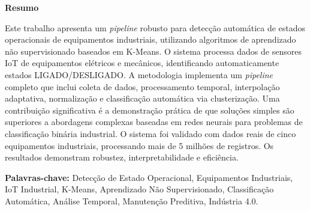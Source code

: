 
\begin{center}
    \huge{{\bf Resumo}}
    \vspace{2cm}

\end{center}

\begin{sloppypar}

    Este trabalho apresenta um \textit{pipeline} robusto para detecção automática de estados operacionais de equipamentos industriais, utilizando algoritmos de aprendizado não supervisionado baseados em K-Means. O sistema processa dados de sensores IoT de equipamentos elétricos e mecânicos, identificando automaticamente estados LIGADO/DESLIGADO. A metodologia implementa um \textit{pipeline} completo que inclui coleta de dados, processamento temporal, interpolação adaptativa, normalização e classificação automática via clusterização. Uma contribuição significativa é a demonstração prática de que soluções simples são superiores a abordagens complexas baseadas em redes neurais para problemas de classificação binária industrial. O sistema foi validado com dados reais de cinco equipamentos industriais, processando mais de 5 milhões de registros. Os resultados demonstram robustez, interpretabilidade e eficiência.

    \vspace{1cm}

    \noindent \textbf{Palavras-chave:} Detecção de Estado Operacional, Equipamentos Industriais, IoT Industrial, K-Means, Aprendizado Não Supervisionado, Classificação Automática, Análise Temporal, Manutenção Preditiva, Indústria 4.0.
\end{sloppypar}

